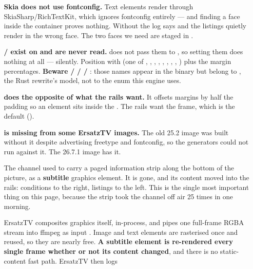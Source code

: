 \documentclass[fontpath=fonts/,logopath=logo/]{riposte-doc}
\begin{document}
\textbf{Skia does not use fontconfig.} Text elements render through SkiaSharp/RichTextKit, which ignores fontconfig entirely —  and  finding a face inside the container proves nothing. Without  the log says  and the listings quietly render in the wrong face. The two faces we need are staged in .

\textbf{ /  exist on  and are never read.}  does not pass them to , so setting them does nothing at all — silently. Position with  (one of , , , , , , , , ) plus the margin percentages. \textbf{Beware  /  /  / }: those names appear in the binary but belong to , the Rust rewrite's model, not to the  enum this engine uses.

\textbf{ does the opposite of what the rails want.} It offsets margins by half the padding so an element sits inside the . The rails want the frame, which is the default ().

\textbf{ is missing from some ErsatzTV images.} The old 25.2  image was built without it despite advertising freetype and fontconfig, so the  generators could not run against it. The 26.7.1 image has it.



The channel used to carry a paged information strip along the bottom of the picture, as a \textbf{subtitle} graphics element. It is gone, and its content moved into the rails: conditions to the right, listings to the left. This is the single most important thing on this page, because the strip took the channel off air 25 times in one morning.

ErsatzTV composites graphics itself, in-process, and pipes one full-frame RGBA stream into ffmpeg as input \ripmono{[1:0]}. Image and text elements are rasterised once and reused, so they are nearly free. \textbf{A subtitle element is re-rendered every single frame whether or not its content changed}, and there is no static-content fast path. ErsatzTV then logs
\end{document}
